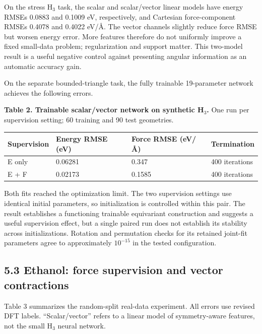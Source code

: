 \documentclass[
  11pt,
  a4paper,
]{article}
\begin{document}
On the stress H\(_3\) task, the scalar and scalar/vector linear models
have energy RMSEs 0.0883 and 0.1009 eV, respectively, and Cartesian
force-component RMSEs 0.4078 and 0.4022 eV/Å. The vector channels
slightly reduce force RMSE but worsen energy error. More features
therefore do not uniformly improve a fixed small-data problem;
regularization and support matter. This two-model result is a useful
negative control against presenting angular information as an automatic
accuracy gain.

On the separate bounded-triangle task, the fully trainable 19-parameter
network achieves the following errors.


\textbf{Table 2. Trainable scalar/vector network on synthetic H\(_3\).}
One run per supervision setting; 60 training and 90 test geometries.

\begin{longtable}[]{@{}llll@{}}
\toprule\noalign{}
Supervision & Energy RMSE (eV) & Force RMSE (eV/Å) & Termination \\
\midrule\noalign{}
\endhead
\bottomrule\noalign{}
\endlastfoot
E only & 0.06281 & 0.347 & 400 iterations \\
E + F & 0.02173 & 0.1585 & 400 iterations \\
\end{longtable}

Both fits reached the optimization limit. The two supervision settings
use identical initial parameters, so initialization is controlled within
this pair. The result establishes a functioning trainable equivariant
construction and suggests a useful supervision effect, but a single
paired run does not establish its stability across initializations.
Rotation and permutation checks for its retained joint-fit parameters
agree to approximately \(10^{-15}\) in the tested configuration.

\hypertarget{ethanol-force-supervision-and-vector-contractions}{%
\subsection{5.3 Ethanol: force supervision and vector
contractions}\label{ethanol-force-supervision-and-vector-contractions}}

Table 3 summarizes the random-split real-data experiment. All errors use
revised DFT labels. ``Scalar/vector'' refers to a linear model of
symmetry-aware features, not the small H\(_3\) neural network.
\end{document}
